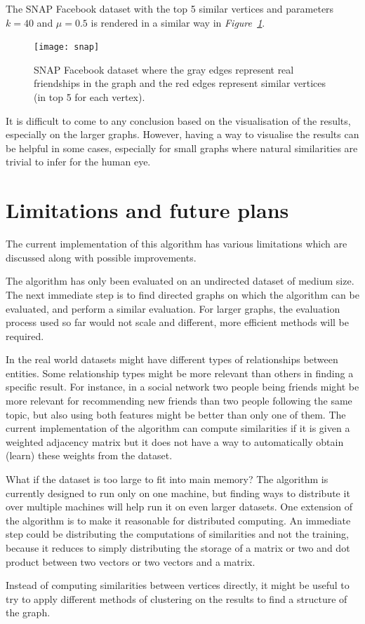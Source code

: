 \documentclass[12pt]{report}
\begin{document}
The SNAP Facebook dataset with the top 5 similar vertices and parameters $k=40$
and $\mu=0.5$ is rendered in a similar way in \emph{Figure~\ref{fig:snap}}.

\begin{figure}[tbp]
  \texttt{[image: snap]}
  \caption{SNAP Facebook dataset where the gray edges represent real friendships
  in the graph and the red edges represent similar vertices (in top 5 for each
  vertex).}
  \label{fig:snap}
\end{figure}

It is difficult to come to any conclusion based on the visualisation of the
results, especially on the larger graphs. However, having a way to visualise
the results can be helpful in some cases, especially for small graphs where
natural similarities are trivial to infer for the human eye.

%
%
\section{Limitations and future plans}
%
The current implementation of this algorithm has various limitations which are
discussed along with possible improvements.


The algorithm has only been evaluated on an undirected dataset of medium size.
The next immediate step is to find directed graphs on which the algorithm can
be evaluated, and perform a similar evaluation. For larger graphs, the evaluation
process used so far would not scale and different, more efficient methods will
be required.


In the real world datasets might have different types of relationships between
entities. Some relationship types might be more relevant than others in finding
a specific result. For instance, in a social network two people being friends
might be more relevant for recommending new friends than two people following the
same topic, but also using both features might be better than only one of them.
The current implementation of the algorithm can compute similarities if it is
given a weighted adjacency matrix but it does not have a way to automatically
obtain (learn) these weights from the dataset.


What if the dataset is too large to fit into main memory? The algorithm is
currently designed to run only on one machine, but finding ways to distribute it
over multiple machines will help run it on even larger datasets. One extension
of the algorithm is to make it reasonable for distributed computing. An immediate
step could be distributing the computations of similarities and not the training,
because it reduces to simply distributing the storage of a matrix or two and dot
product between two vectors or two vectors and a matrix.


Instead of computing similarities between vertices directly, it might be useful
to try to apply different methods of clustering on the results to find a structure
of the graph.


\newpage
{}
{}

\end{document}
